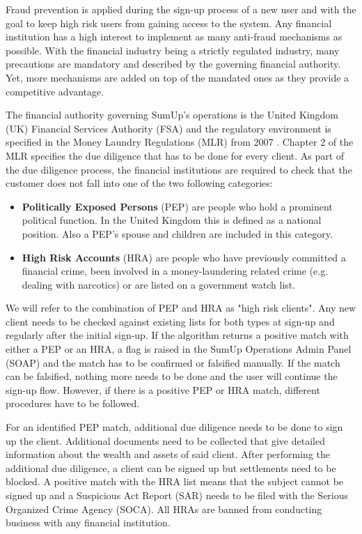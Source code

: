 \documentclass[a4paper, oneside]{csthesis}
\begin{document}
Fraud prevention is applied during the sign-up process of a new user and with the goal to keep high risk users from gaining access to the system.
Any financial institution has a high interest to implement as many anti-fraud mechanisms as possible. With the financial industry being a strictly regulated industry, many precautions are mandatory and described by the governing financial authority. Yet, more mechanisms are added on top of the mandated ones as they provide a competitive advantage.

The financial authority governing SumUp's operations is the United Kingdom (UK) Financial Services Authority (FSA) and the regulatory environment is specified in the Money Laundry Regulations (MLR) from 2007 \cite{website:aml-regulations-2007}. Chapter 2 of the MLR specifies the due diligence that has to be done for every client. As part of the due diligence process, the financial institutions are required to check that the customer does not fall into one of the two following categories:

\begin{itemize}
\item \textbf{Politically Exposed Persons} (PEP) are people who hold a prominent political function. In the United Kingdom this is defined as a national position. Also a PEP's spouse and children are included in this category.

\item \textbf{High Risk Accounts} (HRA) are people who have previously committed a financial crime, been involved in a money-laundering related crime (e.g. dealing with narcotics) or are listed on a government watch list.

\end{itemize}

We will refer to the combination of PEP and HRA as "high risk clients". Any new client needs to be checked against existing lists for both types at sign-up and regularly after the initial sign-up.
If the algorithm returns a positive match with either a PEP or an HRA, a flag is raised in the SumUp Operations Admin Panel (SOAP) and the match has to be confirmed or falsified manually. If the match can be falsified, nothing more needs to be done and the user will continue the sign-up flow. However, if there is a positive PEP or HRA match, different procedures have to be followed.

For an identified PEP match, additional due diligence needs to be done to sign up the client. Additional documents need to be collected that give detailed information about the wealth and assets of said client. After performing the additional due diligence, a client can be signed up but settlements need to be blocked.
A positive match with the HRA list means that the subject cannot be signed up and a Suspicious Act Report (SAR) needs to be filed with the Serious Organized Crime Agency (SOCA). All HRAs are banned from conducting business with any financial institution.
\end{document}
